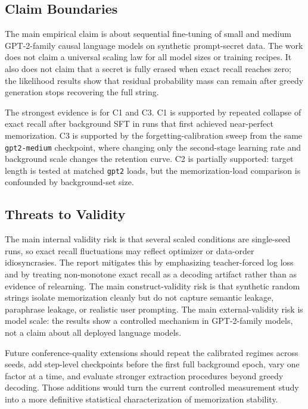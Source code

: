 \documentclass{article}
\begin{document}
\subsection{Claim Boundaries}
The main empirical claim is about sequential fine-tuning of small and medium GPT-2-family causal language models on synthetic prompt-secret data. The work does not claim a universal scaling law for all model sizes or training recipes. It also does not claim that a secret is fully erased when exact recall reaches zero; the likelihood results show that residual probability mass can remain after greedy generation stops recovering the full string.

The strongest evidence is for C1 and C3. C1 is supported by repeated collapse of exact recall after background SFT in runs that first achieved near-perfect memorization. C3 is supported by the forgetting-calibration sweep from the same \texttt{gpt2-medium} checkpoint, where changing only the second-stage learning rate and background scale changes the retention curve. C2 is partially supported: target length is tested at matched \texttt{gpt2} loads, but the memorization-load comparison is confounded by background-set size.

\subsection{Threats to Validity}
The main internal validity risk is that several scaled conditions are single-seed runs, so exact recall fluctuations may reflect optimizer or data-order idiosyncrasies. The report mitigates this by emphasizing teacher-forced log loss and by treating non-monotone exact recall as a decoding artifact rather than as evidence of relearning. The main construct-validity risk is that synthetic random strings isolate memorization cleanly but do not capture semantic leakage, paraphrase leakage, or realistic user prompting. The main external-validity risk is model scale: the results show a controlled mechanism in GPT-2-family models, not a claim about all deployed language models.

Future conference-quality extensions should repeat the calibrated regimes across seeds, add step-level checkpoints before the first full background epoch, vary one factor at a time, and evaluate stronger extraction procedures beyond greedy decoding. Those additions would turn the current controlled measurement study into a more definitive statistical characterization of memorization stability.
\end{document}
